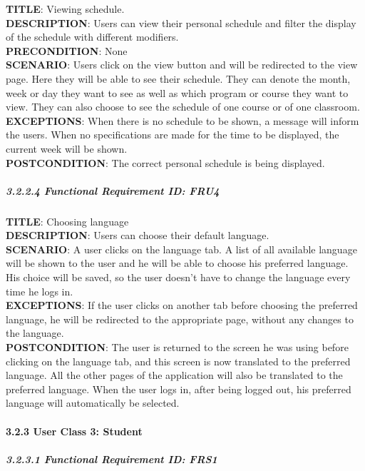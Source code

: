 \documentclass[12pt]{article}
\begin{document}
\textbf{TITLE}: Viewing schedule.\\\textbf{DESCRIPTION}: Users can view
their personal schedule and filter the display of the schedule with
different modifiers.\\\textbf{PRECONDITION}: None\\\textbf{SCENARIO}:
Users click on the view button and will be redirected to the view page.
Here they will be able to see their schedule. They can denote the month,
week or day they want to see as well as which program or course they
want to view. They can also choose to see the schedule of one course or
of one classroom.\\\textbf{EXCEPTIONS}: When there is no schedule to be
shown, a message will inform the users. When no specifications are made
for the time to be displayed, the current week will be
shown.\\\textbf{POSTCONDITION}: The correct personal schedule is being
displayed.

\subparagraph{3.2.2.4 Functional Requirement \textbf{ID}:
FRU4\\}\label{functional-requirement-id-fru4}

\textbf{TITLE}: Choosing language\\\textbf{DESCRIPTION}: Users can
choose their default language.\\\textbf{SCENARIO}: A user clicks on the
language tab. A list of all available language will be shown to the user
and he will be able to choose his preferred language. His choice will be
saved, so the user doesn't have to change the language every time he
logs in.\\\textbf{EXCEPTIONS}: If the user clicks on another tab before
choosing the preferred language, he will be redirected to the
appropriate page, without any changes to the
language.\\\textbf{POSTCONDITION}: The user is returned to the screen he
was using before clicking on the language tab, and this screen is now
translated to the preferred language. All the other pages of the
application will also be translated to the preferred language. When the
user logs in, after being logged out, his preferred language will
automatically be selected.

\paragraph{3.2.3 User Class 3: Student}\label{user-class-3-student}

\subparagraph{3.2.3.1 Functional Requirement \textbf{ID}:
FRS1\\}\label{functional-requirement-id-frs1}
\end{document}
